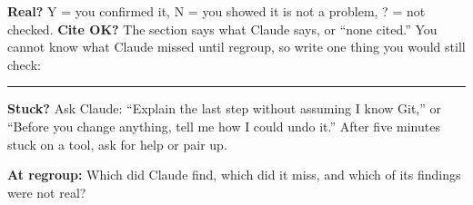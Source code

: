 \footnotesize\textbf{Real?} Y = you confirmed it, N = you showed it is not a problem, ? = not checked. \textbf{Cite OK?} The section says what Claude says, or ``none cited.'' You cannot know what Claude missed until regroup, so write one thing you would still check: \rule[-2pt]{1.3in}{0.4pt}\par\normalsize

\textbf{Stuck?} Ask Claude: ``Explain the last step without assuming I know Git,'' or ``Before you change anything, tell me how I could undo it.'' After five minutes stuck on a tool, ask for help or pair up.

\vfill
\textbf{At regroup:} Which did Claude find, which did it miss, and which of its findings were not real?
